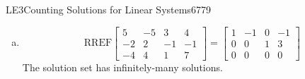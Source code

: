 \begin{exercise}{LE3}{Counting Solutions for Linear Systems}{6779}
\begin{exerciseAnswer}
\begin{enumerate}[(a)]
 
\item  

 \[\mathrm{RREF}\left[\begin{array}{ccc|c}
5 & -5 & 3 & 4 \\
-2 & 2 & -1 & -1 \\
-4 & 4 & 1 & 7
\end{array}\right]=\left[\begin{array}{ccc|c}
1 & -1 & 0 & -1 \\
0 & 0 & 1 & 3 \\
0 & 0 & 0 & 0
\end{array}\right]\] The solution set has infinitely-many solutions. 

 
\end{enumerate}

     \end{exerciseAnswer}
 \end{exercise}


